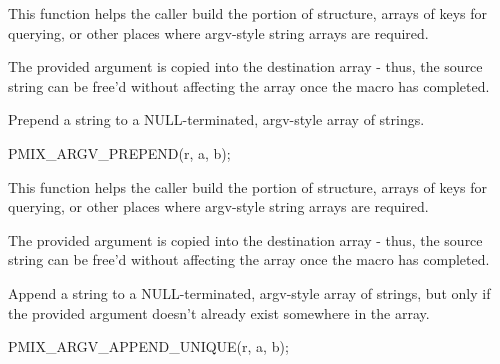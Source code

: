This function helps the caller build the  portion of  structure, arrays of keys for querying, or other places where argv-style string arrays are required.

\adviceuserstart
The provided argument is copied into the destination array - thus, the source string can be free'd without affecting the array once the macro has completed.
\adviceuserend


Prepend a string to a NULL-terminated, argv-style array of strings.

\cspecificstart
\begin{codepar}
PMIX_ARGV_PREPEND(r, a, b);
\end{codepar}
\cspecificend

\begin{arglist}
\end{arglist}

This function helps the caller build the  portion of  structure, arrays of keys for querying, or other places where argv-style string arrays are required.

\adviceuserstart
The provided argument is copied into the destination array - thus, the source string can be free'd without affecting the array once the macro has completed.
\adviceuserend


Append a string to a NULL-terminated, argv-style array of strings, but only if the provided argument doesn't already exist somewhere in the array.

\cspecificstart
\begin{codepar}
PMIX_ARGV_APPEND_UNIQUE(r, a, b);
\end{codepar}
\cspecificend

\begin{arglist}
\end{arglist}

